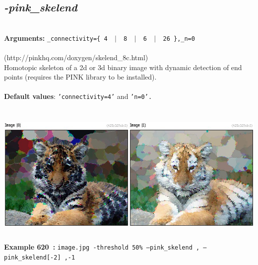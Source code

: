 \documentclass[a4paper,11pt,twoside]{book}
\begin{document}
\subsection{\emph{-pink\_skelend} }\vspace*{-0.5em}
~\\\textbf{Arguments: } 
{\small \texttt{\_connectivity=\{ 4 ~$|$~ 8 ~$|$~ 6 ~$|$~ 26 \},\_n=0}}\\~\\
(http://pinkhq.com/doxygen/skelend\_8c.html)
~\\Homotopic skeleton of a 2d or 3d binary image with dynamic detection of end points (requires the PINK library to be installed).
~\\~\\\textbf{Default values}: {\small \texttt{'connectivity=4'} and \texttt{'n=0'.}}
\begin{center}\includegraphics[keepaspectratio=true,height=7cm,width=\textwidth]{img/gmic_def620.jpg}\\
{\footnotesize \textbf{Example 620~:} \texttt{image.jpg -threshold 50\% --pink\_skelend , --pink\_skelend[-2] ,-1}}
\end{center}
\end{document}
